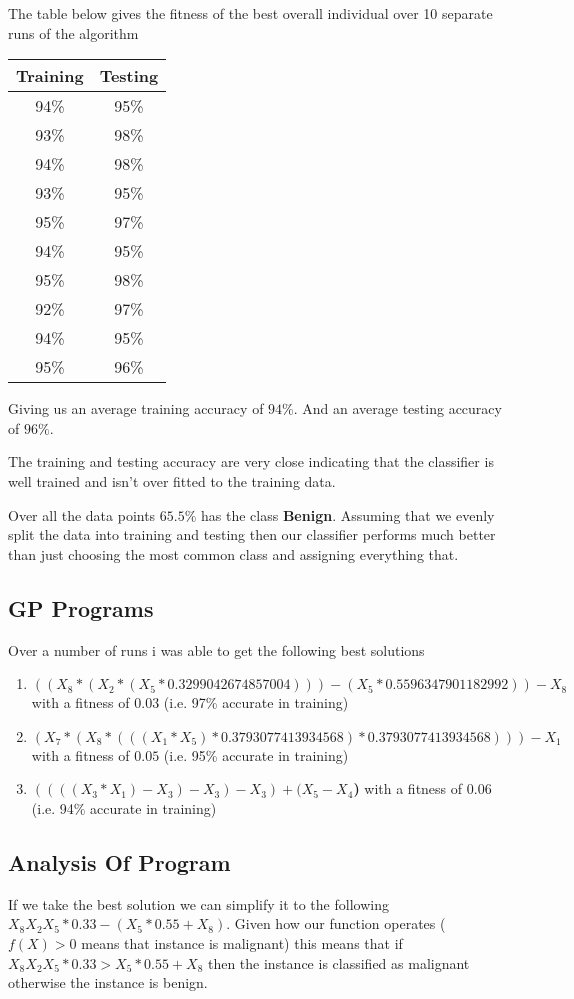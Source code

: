 \documentclass[a4paper, 12pt]{article}
\begin{document}
			The table below gives the fitness of the best overall individual over 10 separate runs of the algorithm		
		
			\begin{center}
				\begin{tabular}{|c|c|}
					\hline
					Training & Testing\\
					\hline
					94\% & 95\%\\
					93\% & 98\%\\
					94\% & 98\%\\
					93\% & 95\%\\
					95\% & 97\%\\
					94\% & 95\%\\
					95\% & 98\%\\
					92\% & 97\%\\
					94\% & 95\%\\
					95\% & 96\%\\
					\hline
				\end{tabular}
			\end{center}
			
			Giving us an average training accuracy of $94\%$. And an average testing accuracy of $96\%$.
			
			The training and testing accuracy are very close indicating that the classifier is well trained and isn't over fitted to the training data.
			
			Over all the data points $65.5\%$ has the class \textbf{Benign}. Assuming that we evenly split the data into training and testing then our classifier performs much better than just choosing the most common class and assigning everything that.
		
		\subsection{GP Programs}
			Over a number of runs i was able to get the following best solutions
			
			\begin{enumerate}
				\item \textbf{$((X_8 * (X_2 * (X_5 * 0.3299042674857004))) - (X_5 * 0.5596347901182992)) - X_8$} with a fitness of $0.03$ (i.e. 97\% accurate in training)	
			
				\item \textbf{$(X_7 * (X_8 * (((X_1 * X_5) * 0.3793077413934568) * 0.3793077413934568))) - X_1$} with a fitness of $0.05$ (i.e. 95\% accurate in training)
				
				\item \textbf{$((((X_3 * X_1) - X_3) - X_3) - X_3) + (X_5 - X_4$)} with a fitness of $0.06$ (i.e. 94\% accurate in training)
			\end{enumerate}
		
		\subsection{Analysis Of Program}		
			If we take the best solution we can simplify it to the following $X_8X_2X_5*0.33 - (X_5*0.55 + X_8)$. Given how our function operates ($f(X) > 0$ means that instance is malignant) this means that if $X_8X_2X_5*0.33 > X_5*0.55 + X_8$ then the instance is classified as malignant otherwise the instance is benign.
\end{document}
